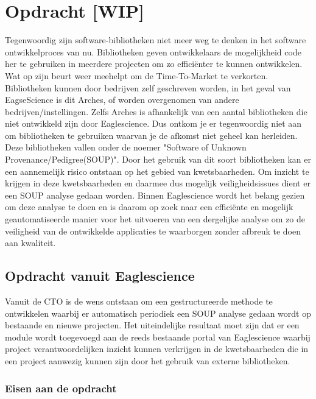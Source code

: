 
\chapter{Opdracht [WIP]} %
\label{ch:opdracht} %
Tegenwoordig zijn software-bibliotheken niet meer weg te denken in het software ontwikkelproces van nu. Bibliotheken geven ontwikkelaars de mogelijkheid code her te gebruiken in meerdere projecten om zo effici\"enter te kunnen ontwikkelen. Wat op zijn beurt weer meehelpt om de Time-To-Market te verkorten. Bibliotheken kunnen door bedrijven zelf geschreven worden, in het geval van EagseScience is dit Arches, of worden overgenomen van andere bedrijven/instellingen. Zelfs Arches is afhankelijk van een aantal bibliotheken die niet ontwikkeld zijn door Eaglescience. Dus ontkom je er tegenwoordig niet aan om bibliotheken te gebruiken waarvan je de afkomst niet geheel kan herleiden.\\
Deze bibliotheken vallen onder de noemer "Software of Unknown Provenance/Pedigree(SOUP)". Door het gebruik van dit soort bibliotheken kan er een aannemelijk risico ontstaan op het gebied van kwetsbaarheden. Om inzicht te krijgen in deze kwetsbaarheden en daarmee dus mogelijk veiligheidsissues dient er een SOUP analyse gedaan worden. Binnen Eaglescience wordt het belang gezien om deze analyse te doen en is daarom op zoek naar een efficiënte en mogelijk geautomatiseerde manier voor het uitvoeren van een dergelijke analyse om zo de veiligheid van de ontwikkelde applicaties te waarborgen zonder afbreuk te doen aan kwaliteit. 

\section{Opdracht vanuit Eaglescience}
Vanuit de CTO is de wens ontstaan om een gestructureerde methode te ontwikkelen waarbij er automatisch periodiek een SOUP analyse gedaan wordt op bestaande en nieuwe projecten. Het uiteindelijke resultaat moet zijn dat er een module wordt toegevoegd aan de reeds bestaande portal van Eaglescience waarbij project verantwoordelijken inzicht kunnen verkrijgen in de kwetsbaarheden die in een project aanwezig kunnen zijn door het gebruik van externe bibliotheken.

\subsection{Eisen aan de opdracht}

